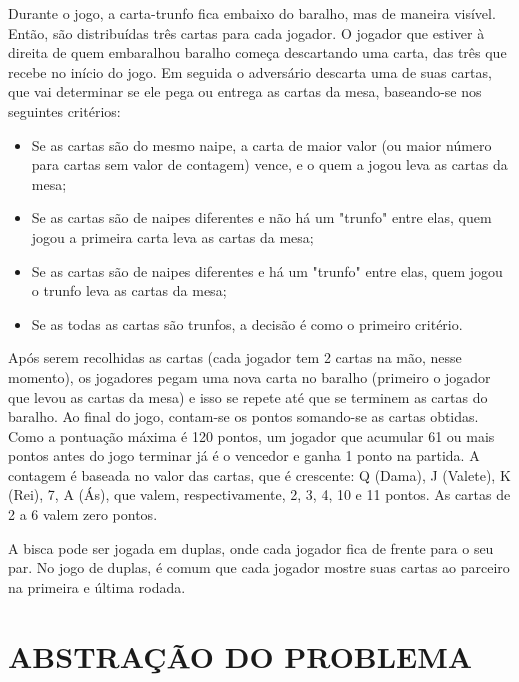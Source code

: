 \documentclass[12pt, oneside, a4paper, brazil]{abntex2}
\begin{document}
Durante o jogo, a carta-trunfo fica embaixo do baralho, mas de maneira visível. Então, são distribuídas três cartas para cada jogador. O jogador que estiver à direita de quem embaralhou baralho começa descartando uma carta, das três que recebe no início do jogo. Em seguida o adversário descarta uma de suas cartas, que vai determinar se ele pega ou entrega as cartas da mesa, baseando-se nos seguintes critérios:

\begin{itemize}
    \item Se as cartas são do mesmo naipe, a carta de maior valor (ou maior número para cartas sem valor de contagem) vence, e o quem a jogou leva as cartas da mesa;
    
    \item Se as cartas são de naipes diferentes e não há um "trunfo" entre elas, quem jogou a primeira carta leva as cartas da mesa;
    
    \item Se as cartas são de naipes diferentes e há um "trunfo" entre elas, quem jogou o trunfo leva as cartas da mesa;
    
    \item Se as todas as cartas são trunfos, a decisão é como o primeiro critério.

\end{itemize}

Após serem recolhidas as cartas (cada jogador tem 2 cartas na mão, nesse momento), os jogadores pegam uma nova carta no baralho (primeiro o jogador que levou as cartas da mesa) e isso se repete até que se terminem as cartas do baralho. Ao final do jogo, contam-se os pontos somando-se as cartas obtidas. Como a pontuação máxima é 120 pontos, um jogador que acumular 61 ou mais pontos antes do jogo terminar já é o vencedor e ganha 1 ponto na partida. A contagem é baseada no valor das cartas, que é crescente: Q (Dama), J (Valete), K (Rei), 7, A (Ás), que valem, respectivamente, 2, 3, 4, 10 e 11 pontos. As cartas de 2 a 6 valem zero pontos.

A bisca pode ser jogada em duplas, onde cada jogador fica de frente para o seu par. No jogo de duplas, é comum que cada jogador mostre suas cartas ao parceiro na primeira e última rodada.

\chapter{ABSTRAÇÃO DO PROBLEMA}\label{cap:2}
\end{document}
